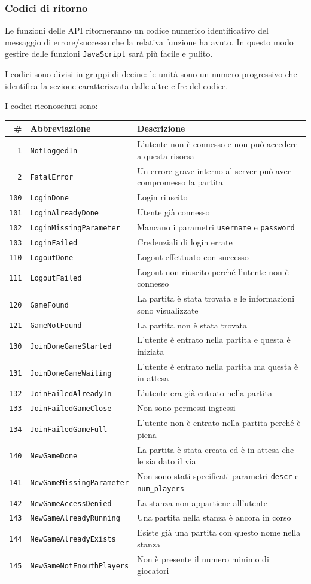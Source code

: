 \documentclass[10pt,a4paper]{article}
\newcommand{\apicode}[3]{
\texttt{#1} & \texttt{#2} & #3 \\
}
\begin{document}
\subsubsection{Codici di ritorno}
Le funzioni delle API ritorneranno un codice numerico identificativo del messaggio di errore/successo che la relativa funzione ha avuto. In questo modo gestire delle funzioni \texttt{JavaScript} sarà più facile e pulito. 

I codici sono divisi in gruppi di decine: le unità sono un numero progressivo che identifica la sezione caratterizzata dalle altre cifre del codice.

I codici riconosciuti sono:

\resizebox{\textwidth}{!} {
\begin{tabular}{|rl|l|}
\hline
\textbf{\#} & \textbf{Abbreviazione} & \textbf{Descrizione} \\
\hline
\apicode{1}{NotLoggedIn}{L'utente non è connesso e non può accedere a questa risorsa}
\apicode{2}{FatalError}{Un errore grave interno al server può aver compromesso la partita}
\hline
\apicode{100}{LoginDone}{Login riuscito}
\apicode{101}{LoginAlreadyDone}{Utente già connesso}
\apicode{102}{LoginMissingParameter}{Mancano i parametri \texttt{username} e \texttt{password}}
\apicode{103}{LoginFailed}{Credenziali di login errate}
\hline
\apicode{110}{LogoutDone}{Logout effettuato con successo}
\apicode{111}{LogoutFailed}{Logout non riuscito perché l'utente non è connesso}
\hline
\apicode{120}{GameFound}{La partita è stata trovata e le informazioni sono visualizzate}
\apicode{121}{GameNotFound}{La partita non è stata trovata}
\hline
\apicode{130}{JoinDoneGameStarted}{L'utente è entrato nella partita e questa è iniziata}
\apicode{131}{JoinDoneGameWaiting}{L'utente è entrato nella partita ma questa è in attesa}
\apicode{132}{JoinFailedAlreadyIn}{L'utente era già entrato nella partita}
\apicode{133}{JoinFailedGameClose}{Non sono permessi ingressi}
\apicode{134}{JoinFailedGameFull}{L'utente non è entrato nella partita perché è piena}
\hline
\apicode{140}{NewGameDone}{La partita è stata creata ed è in attesa che le sia dato il via}
\apicode{141}{NewGameMissingParameter}{Non sono stati specificati parametri \texttt{descr} e \texttt{num\_players}}
\apicode{142}{NewGameAccessDenied}{La stanza non appartiene all'utente}
\apicode{143}{NewGameAlreadyRunning}{Una partita nella stanza è ancora in corso}
\apicode{144}{NewGameAlreadyExists}{Esiste già una partita con questo nome nella stanza}
\apicode{145}{NewGameNotEnouthPlayers}{Non è presente il numero minimo di giocatori}

\end{tabular}}
\end{document}
